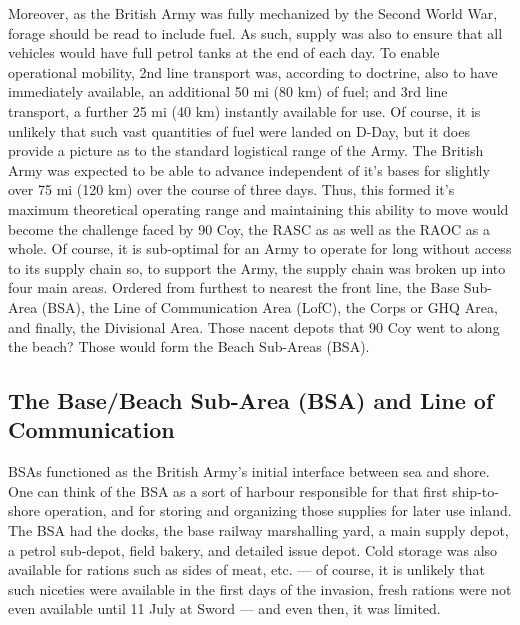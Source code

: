 \documentclass[noraggedright]{turabian-researchpaper}
\newcommand{\Petrol}{Precis of Lecture No. 12:  Petrol}
\newcommand{\MaintProj}{Precis of Lecture No. 5:  ``Key Plans and Maintenance Projects''}
\newcommand{\SupInWar}{Precis on Lecture ``Supplies in War'', (Part II)}
\begin{document}
Moreover, as the British Army was fully mechanized by the Second World War,
forage should be read to include fuel.  As such, supply was also to ensure 
that all vehicles would have full petrol tanks at the end of each 
day.\autocite[73, 79--80]{feat} To enable operational mobility, 2nd line 
transport was, according to doctrine, also to have immediately available, an 
additional 50 mi (80 km) of fuel; and 3rd line transport, a further 25 mi (40 
km) instantly available for use.\autocite[\Petrol][s 3] {27course} Of course, 
it is unlikely that such vast quantities of fuel were landed on D-Day, but it 
does provide a picture as to the standard logistical range of the Army.  The 
British Army was expected to be able to advance independent of it's bases for 
slightly over 75 mi (120 km) over the course of three days.  Thus, this 
formed it's maximum theoretical operating range and maintaining this ability 
to move would become the challenge faced by 90 Coy, the RASC as as well as 
the RAOC as a whole.
Of course, it is sub-optimal for an Army to operate for long without access 
to its supply chain so, to support the Army, the supply chain was broken up 
into four main areas. Ordered from furthest to nearest the front line, the 
Base Sub-Area (BSA), the Line of Communication Area (LofC), the Corps or GHQ 
Area, and finally, the Divisional Area.  Those nacent depots that 90 Coy went 
to along the beach?  Those would form the Beach Sub-Areas (BSA).  

\subsection{The Base/Beach Sub-Area (BSA) and Line of Communication}

BSAs functioned as 
the British Army's initial interface between sea and shore.  One can think of 
the BSA as a sort of harbour responsible for that first ship-to-shore 
operation, and for storing and organizing those supplies for later use inland.
The BSA had %
the docks, the base railway marshalling yard, a main supply depot, a petrol
sub-depot, field bakery, and detailed issue depot.\autocites
[\MaintProj][Paras 8 -- 9, see also the diagram on the recto of the first page
of the precis.]{27course}[\SupInWar][]{27course}
Cold storage was also 
available for rations such as sides of meat, etc. --- of course, it is unlikely
that such niceties were available in the first days of the invasion, fresh
rations were not even available until 11 July at Sword --- and even then, it 
was limited.\autocite[\SupInWar][See diagram at end]{27course}%
\end{document}
